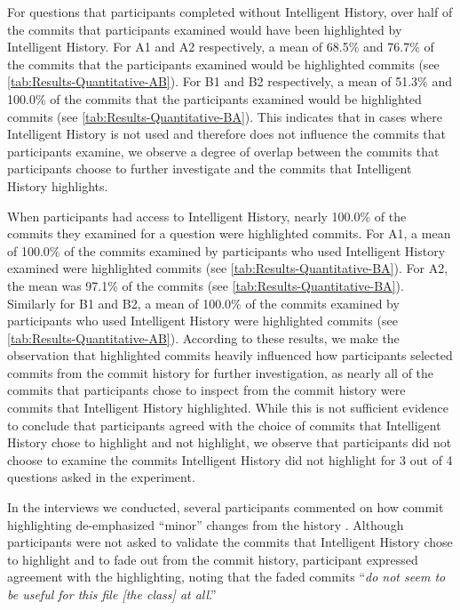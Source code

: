 For questions that participants completed without Intelligent History,
over half of the commits that participants examined would have been highlighted by Intelligent History.
For A1 and A2 respectively, a mean of 68.5\% and 76.7\% 
of the commits that the participants examined would be highlighted commits (see \autoref{tab:Results-Quantitative-AB}).
For B1 and B2 respectively, a mean of 51.3\% and 100.0\% 
of the commits that the participants examined would be highlighted commits (see \autoref{tab:Results-Quantitative-BA}).
This indicates that in cases where Intelligent History is not used and therefore does not influence the commits that participants examine,
we observe a degree of overlap between the commits that participants choose to further investigate and the commits that Intelligent History highlights.

When participants had access to Intelligent History,
nearly 100.0\% of the commits they examined for a question were highlighted commits.
For A1, a mean of 100.0\% of the commits examined by participants who used Intelligent History examined 
were highlighted commits (see \autoref{tab:Results-Quantitative-BA}).
For A2, the mean was 97.1\% of the commits (see \autoref{tab:Results-Quantitative-BA}).
Similarly for B1 and B2, a mean of 100.0\% of the commits examined by participants who used Intelligent History 
were highlighted commits (see \autoref{tab:Results-Quantitative-AB}).
According to these results, we make the observation that highlighted commits heavily 
influenced how participants selected commits from the commit history for further investigation, as
nearly all of the commits that participants chose to inspect from the commit history were commits that Intelligent History highlighted.
While this is not sufficient evidence to conclude that participants agreed with the choice of commits that Intelligent History
chose to highlight and not highlight, we observe that participants did not choose to examine the 
commits Intelligent History did not highlight for 3 out of 4 questions asked in the experiment.

In the interviews we conducted, 
several participants commented on how commit highlighting de-emphasized ``minor'' changes from the history .
Although participants were not asked to validate the commits that Intelligent History chose to highlight and to fade out from the commit history, 
participant  expressed agreement with the highlighting, 
noting that the faded commits ``\textit{do not seem to be useful for this file [the  class] at all}.''

